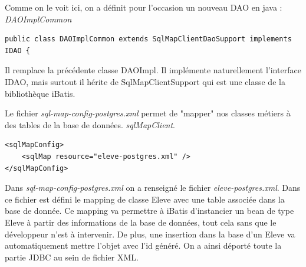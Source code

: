 \documentclass[a4paper,12pt]{article}
\begin{document}
Comme on le voit ici, on a définit pour l'occasion un nouveau DAO en java : \textit{DAOImplCommon}

\begin{lstlisting}
public class DAOImplCommon extends SqlMapClientDaoSupport implements IDAO {
\end{lstlisting}

Il remplace la précédente classe DAOImpl.
Il implémente naturellement l'interface IDAO, mais surtout il hérite de SqlMapClientSupport qui est une classe de la bibliothèque iBatis.

Le fichier  \textit{sql-map-config-postgres.xml} permet de "mapper" nos classes métiers à des tables de la base de données.
\textit{sqlMapClient}. 

\begin{lstlisting}
<sqlMapConfig>
	<sqlMap resource="eleve-postgres.xml" />
</sqlMapConfig>
\end{lstlisting}

Dans \textit{sql-map-config-postgres.xml} on a renseigné le fichier \textit{eleve-postgres.xml}. Dans ce fichier est défini le mapping de classe Eleve avec une table associée dans la base de donnée. Ce mapping va permettre à iBatis d'instancier un bean de type Eleve à partir des informations de la base de données, tout cela sans que le développeur n'est à intervenir. De plus, une insertion dans la base d'un Eleve va automatiquement mettre l'objet avec l'id généré.
On a ainsi déporté toute la partie JDBC au sein de fichier XML.
\end{document}
